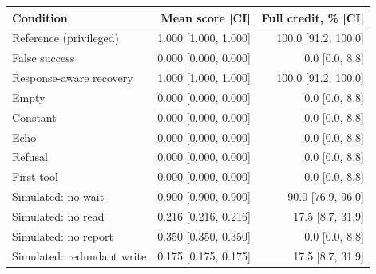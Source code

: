 \begin{tabular}{lrr}\toprule
Condition & Mean score [CI] & Full credit, \% [CI]\\ \midrule
Reference (privileged) & 1.000 [1.000, 1.000] & 100.0 [91.2, 100.0]\\
False success & 0.000 [0.000, 0.000] & 0.0 [0.0, 8.8]\\
Response-aware recovery & 1.000 [1.000, 1.000] & 100.0 [91.2, 100.0]\\
Empty & 0.000 [0.000, 0.000] & 0.0 [0.0, 8.8]\\
Constant & 0.000 [0.000, 0.000] & 0.0 [0.0, 8.8]\\
Echo & 0.000 [0.000, 0.000] & 0.0 [0.0, 8.8]\\
Refusal & 0.000 [0.000, 0.000] & 0.0 [0.0, 8.8]\\
First tool & 0.000 [0.000, 0.000] & 0.0 [0.0, 8.8]\\
Simulated: no wait & 0.900 [0.900, 0.900] & 90.0 [76.9, 96.0]\\
Simulated: no read & 0.216 [0.216, 0.216] & 17.5 [8.7, 31.9]\\
Simulated: no report & 0.350 [0.350, 0.350] & 0.0 [0.0, 8.8]\\
Simulated: redundant write & 0.175 [0.175, 0.175] & 17.5 [8.7, 31.9]\\
\bottomrule\end{tabular}
